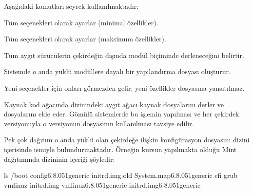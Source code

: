 \documentclass[a4paper,10pt,turkish]{sphinxmanual}
\begin{document}
\sphinxAtStartPar
Aşağıdaki  komutları seyrek kullanılmaktadır:
\begin{description}
\sphinxAtStartPar
Tüm seçenekleri  olarak ayarlar (minimal özellikler).

\sphinxAtStartPar
Tüm seçenekleri  olarak ayarlar (maksimum özellikler).

\sphinxAtStartPar
Tüm aygıt sürücülerin çekirdeğin dışında modül biçiminde derleneceğini belirtir.

\sphinxAtStartPar
Sistemde o anda yüklü modüllere dayalı bir yapılandırma dosyası oluşturur.

\sphinxAtStartPar
Yeni seçenekler için onları görmezden gelir; yeni özellikler  dosyasına yansıtılmaz.

\sphinxAtStartPar
Kaynak kod ağacında  dizinindeki aygıt ağacı kaynak dosyalarını
derler ve  dosyalarını elde eder. Gömülü sistemlerde bu işlemin yapılması ve her çekirdek
versiyonuyla o versiyonun  dosyasının kullanılması tavsiye edilir.

\end{description}

\sphinxAtStartPar
Pek çok dağıtım o anda yüklü olan çekirdeğe ilişkin konfigürasyon dosyasını  dizini
içerisinde  ismiyle bulundurmaktadır. Örneğin kursun yapılmakta olduğu Mint
dağıtımında  dizininin içeriği şöyledir:

\begin{sphinxVerbatim}[commandchars=\\\{\}]
\PYGZdl{} ls /boot
config\PYGZhy{}6.8.0\PYGZhy{}51\PYGZhy{}generic      initrd.img.old
System.map\PYGZhy{}6.8.0\PYGZhy{}51\PYGZhy{}generic  efi
grub                         vmlinuz
initrd.img                   vmlinuz\PYGZhy{}6.8.0\PYGZhy{}51\PYGZhy{}generic
initrd.img\PYGZhy{}6.8.0\PYGZhy{}51\PYGZhy{}generic
\end{sphinxVerbatim}
\end{document}
